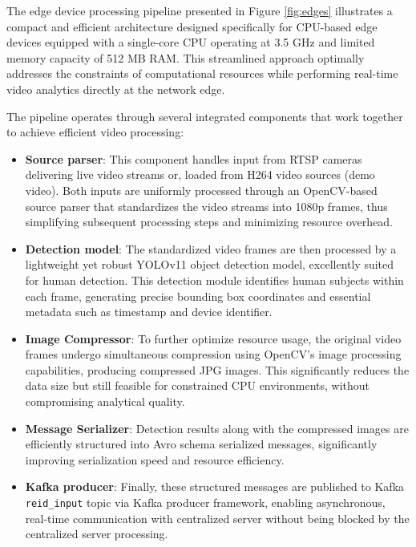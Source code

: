 The edge device processing pipeline presented in Figure \ref{fig:edges} illustrates a compact and efficient architecture designed specifically for CPU-based edge devices equipped with a single-core CPU operating at 3.5 GHz and limited memory capacity of 512 MB RAM. This streamlined approach optimally addresses the constraints of computational resources while performing real-time video analytics directly at the network edge.

The pipeline operates through several integrated components that work together to achieve efficient video processing:

\begin{itemize}
    \item \textbf{Source parser}: This component handles input from RTSP cameras delivering live video streams or, loaded from H264 video sources (demo video). Both inputs are uniformly processed through an OpenCV-based source parser that standardizes the video streams into 1080p frames, thus simplifying subsequent processing steps and minimizing resource overhead.
    
    \item \textbf{Detection model}: The standardized video frames are then processed by a lightweight yet robust YOLOv11 object detection model, excellently suited for human detection. This detection module identifies human subjects within each frame, generating precise bounding box coordinates and essential metadata such as timestamp and device identifier.
    
    \item \textbf{Image Compressor}: To further optimize resource usage, the original video frames undergo simultaneous compression using OpenCV's image processing capabilities, producing compressed JPG images. This significantly reduces the data size but still feasible for constrained CPU environments, without compromising analytical quality.
    
    \item \textbf{Message Serializer}: Detection results along with the compressed images are efficiently structured into Avro schema serialized messages, significantly improving serialization speed and resource efficiency.
    
    \item \textbf{Kafka producer}: Finally, these structured messages are published to Kafka \texttt{reid\_input} topic via Kafka producer framework, enabling asynchronous, real-time communication with centralized server without being blocked by the centralized server processing.
\end{itemize}

